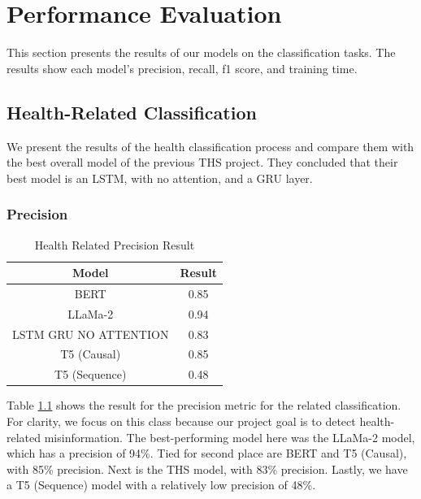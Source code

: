 


\chapter{Performance Evaluation}  
This section presents the results of our models on the classification tasks. The results show each model's precision, recall, f1 score, and training time.


\section{Health-Related Classification}
We present the results of the health classification process and compare them with the best overall model of the previous THS project. They concluded
that their best model is an LSTM, with no attention, and a GRU layer.

\subsection{Precision}
\begin{table}[H]
	\centering
	\caption{Health Related Precision Result}
	\begin{tabular}{||c | c||} 
		\hline
		\textbf{Model} & \textbf{Result} \\ [0.5ex] 
		\hline
		BERT & 0.85  \\
		\hline
		LLaMa-2 & 0.94 \\ 
		\hline
		LSTM GRU NO ATTENTION & 0.83  \\
		\hline
		T5 (Causal) & 0.85 \\
		\hline
		T5 (Sequence) & 0.48 \\
		\hline
	\end{tabular}
	\label{table:HealthPrecision}
\end{table}

Table \ref{table:HealthPrecision} shows the result for the precision metric for the related classification. For clarity, we focus on this class because our project
goal is to detect health-related misinformation. The best-performing model here was the LLaMa-2 model, which has a precision of 94\%. Tied for second place
are BERT and T5 (Causal), with 85\% precision. Next is the THS model, with 83\% precision. Lastly, we have a T5 (Sequence) model with a relatively low
precision of 48\%.

